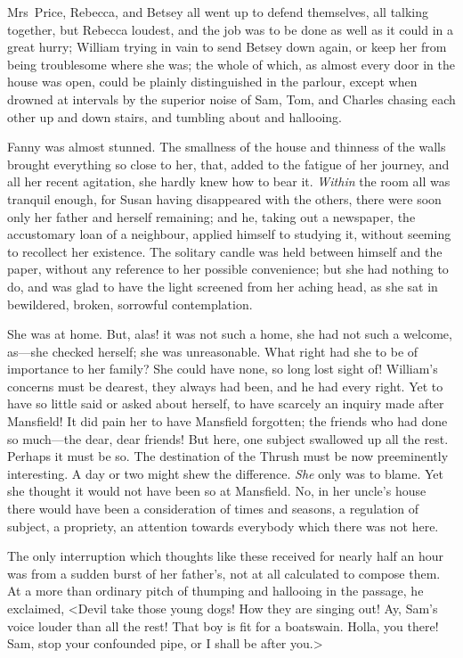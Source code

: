 Mrs~Price, Rebecca, and Betsey all went up to defend themselves, all talking together, but Rebecca loudest, and the job was to be done as well as it could in a great hurry; William trying in vain to send Betsey down again, or keep her from being troublesome where she was; the whole of which, as almost every door in the house was open, could be plainly distinguished in the parlour, except when drowned at intervals by the superior noise of Sam, Tom, and Charles chasing each other up and down stairs, and tumbling about and hallooing.

Fanny was almost stunned. The smallness of the house and thinness of the walls brought everything so close to her, that, added to the fatigue of her journey, and all her recent agitation, she hardly knew how to bear it. \textit{Within}  the room all was tranquil enough, for Susan having disappeared with the others, there were soon only her father and herself remaining; and he, taking out a newspaper, the accustomary loan of a neighbour, applied himself to studying it, without seeming to recollect her existence. The solitary candle was held between himself and the paper, without any reference to her possible convenience; but she had nothing to do, and was glad to have the light screened from her aching head, as she sat in bewildered, broken, sorrowful contemplation.

She was at home. But, alas! it was not such a home, she had not such a welcome, as—she checked herself; she was unreasonable. What right had she to be of importance to her family? She could have none, so long lost sight of! William's concerns must be dearest, they always had been, and he had every right. Yet to have so little said or asked about herself, to have scarcely an inquiry made after Mansfield! It did pain her to have Mansfield forgotten; the friends who had done so much—the dear, dear friends! But here, one subject swallowed up all the rest. Perhaps it must be so. The destination of the Thrush must be now preeminently interesting. A day or two might shew the difference. \textit{She}  only was to blame. Yet she thought it would not have been so at Mansfield. No, in her uncle's house there would have been a consideration of times and seasons, a regulation of subject, a propriety, an attention towards everybody which there was not here.

The only interruption which thoughts like these received for nearly half an hour was from a sudden burst of her father's, not at all calculated to compose them. At a more than ordinary pitch of thumping and hallooing in the passage, he exclaimed, <Devil take those young dogs! How they are singing out! Ay, Sam's voice louder than all the rest! That boy is fit for a boatswain. Holla, you there! Sam, stop your confounded pipe, or I shall be after you.>

